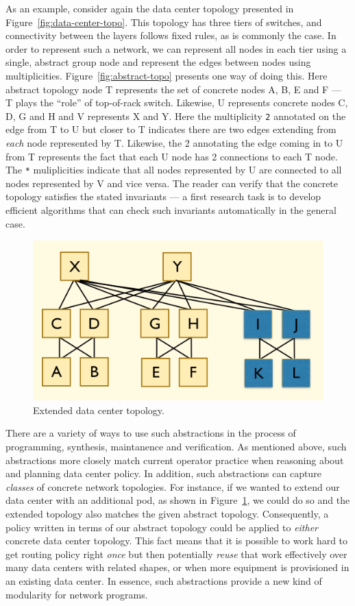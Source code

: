 As an example, consider again the data center topology presented in
Figure~\ref{fig:data-center-topo}.  This topology has three tiers of
switches, and connectivity between the layers follows fixed rules,
as is commonly the case.  In order to represent such a network,
we can represent all nodes in each tier using a single, abstract group
node and represent the edges between nodes using multiplicities.
Figure~\ref{fig:abstract-topo} presents one way of doing this.
Here abstract topology node T represents the set of concrete nodes
A, B, E and F --- T plays the ``role'' of top-of-rack switch.  Likewise,
U represents concrete nodes C, D, G and H and V represents X and Y.
Here the multiplicity \texttt{2} annotated on the edge from T to U but closer
to T indicates there are two edges extending from \emph{each} node
represented by T.  Likewise, the 2 annotating the edge coming
in to U from T represents the fact that each U node has 2 connections
to each T node.  The \texttt{*} muliplicities indicate that all nodes
represented by U are connected to all nodes represented by V and vice
versa.  The reader can verify that the concrete topology satisfies the
stated invariants --- a first research task is to develop efficient algorithms
that can check such invariants automatically in the general case.

\begin{figure}
  \centering
  \includegraphics[width=.35\textwidth]{figures/extended-topo}
\caption{Extended data center topology.}
  \label{fig:extended-topo}
  \vspace{-1em}
\end{figure}
There are a variety of ways to use such abstractions in the process of
programming, synthesis, maintanence and verification.  As mentioned above,
such abstractions more closely match current operator practice when
reasoning about and planning data center policy.  In addition, such
abstractions can capture \emph{classes} of concrete network topologies.
For instance, if we wanted to extend our data center with an additional pod,
as shown in Figure~\ref{fig:extended-topo}, we could do so and 
the extended topology also
matches the given abstract topology.  Consequently, a policy written in
terms of our abstract topology could be applied to \emph{either} concrete
data center topology.  This fact means that it is possible to work hard
to get routing policy right \emph{once} but then potentially \emph{reuse} that
work effectively over many data centers with related shapes, or when more
equipment is provisioned in an existing data center.  In essence,
such abstractions provide a new kind of modularity for network programs.

